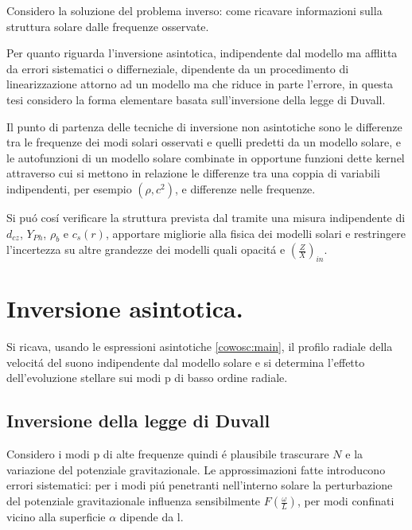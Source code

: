 \documentclass[../main.tex]{subfiles}
\begin{document}
Considero la soluzione del problema inverso: come ricavare informazioni sulla struttura solare dalle frequenze osservate.

Per quanto riguarda l'inversione asintotica, indipendente dal modello ma afflitta da errori sistematici o differneziale, dipendente da un procedimento di linearizzazione attorno ad un modello ma che riduce in parte l'errore, in questa tesi considero la forma elementare basata sull'inversione della legge di Duvall.

Il punto di partenza delle tecniche di inversione non asintotiche sono le  differenze tra le frequenze dei modi solari osservati e quelli predetti da un modello solare, e le autofunzioni di un modello solare combinate in opportune funzioni dette kernel attraverso cui si mettono in relazione le differenze tra una coppia di variabili indipendenti, per esempio $(\rho,c^2)$, e differenze nelle frequenze.

Si pu\'o cos\'i verificare la struttura prevista dal \mss{} tramite una misura indipendente di $d_{cz}$, $Y_{Ph}$, $\rho_b$ e $c_s(r)$, apportare migliorie alla fisica dei modelli solari e restringere l'incertezza su altre grandezze dei modelli quali opacit\'a e $(\frac{Z}{X})_{in}$.


{\let\clearpage\relax \chapter{Inversione asintotica.}} %


Si ricava, usando le espressioni asintotiche \eqref{cowosc:main}, il profilo radiale della velocit\'a del suono indipendente dal modello solare e si determina l'effetto dell'evoluzione stellare sui modi p di basso ordine radiale.

\section{Inversione della legge di Duvall}

Considero i modi p di alte frequenze quindi \'e plausibile trascurare $N$ e la variazione del potenziale gravitazionale. Le approssimazioni fatte introducono errori sistematici: per i modi pi\'u penetranti nell'interno solare la perturbazione del potenziale gravitazionale influenza sensibilmente $F(\frac{\omega}{L})$, per modi confinati vicino alla superficie $\alpha$ dipende da l.
\end{document}
